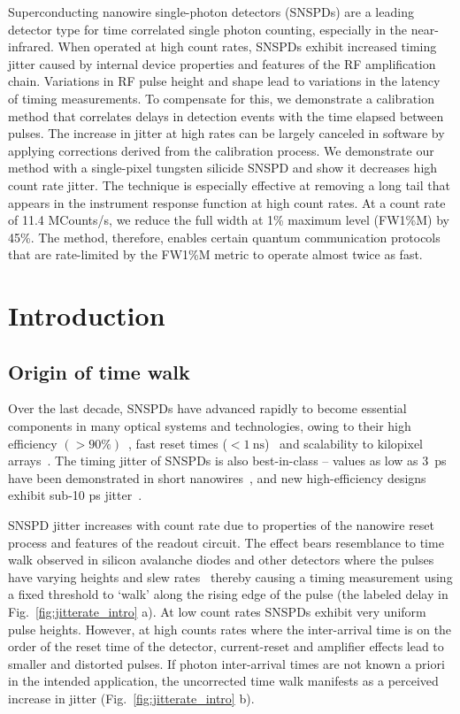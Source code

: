 \documentclass[11pt]{caltech_thesis} %
\begin{document}
Superconducting nanowire single-photon detectors (SNSPDs) are a leading
detector type for time correlated single photon counting, especially in
the near-infrared. When operated at high count rates, SNSPDs exhibit
increased timing jitter caused by internal device properties and
features of the RF amplification chain. Variations in RF pulse height
and shape lead to variations in the latency of timing measurements. To
compensate for this, we demonstrate a calibration method that correlates
delays in detection events with the time elapsed between pulses. The
increase in jitter at high rates can be largely canceled in software by
applying corrections derived from the calibration process. We
demonstrate our method with a single-pixel tungsten silicide SNSPD and
show it decreases high count rate jitter. The technique is especially
effective at removing a long tail that appears in the instrument
response function at high count rates. At a count rate of 11.4
MCounts/s, we reduce the full width at 1\% maximum level (FW1\%M) by
45\%. The method, therefore, enables certain quantum communication
protocols that are rate-limited by the FW1\%M metric to operate almost
twice as fast.

\hypertarget{introduction-1}{%
\section{Introduction}\label{introduction-1}}

\hypertarget{origin-of-time-walk}{%
\subsection{Origin of time walk}\label{origin-of-time-walk}}

Over the last decade, SNSPDs have advanced rapidly to become essential
components in many optical systems and technologies, owing to their high
efficiency
$(>90\%)$~\autocite{99.5_Chang_2021,reddy2020superconducting},
fast reset times
($< 1~\mathrm{ns}$)~\autocite{Vetter2016Cavity} and
scalability to kilopixel arrays~\autocite{Wollman2019}.
The timing jitter of SNSPDs is also best-in-class -- values as low as
3~ps have been demonstrated in short
nanowires~\autocite{Korzh2020}, and new high-efficiency
designs exhibit sub-10 ps
jitter~\autocite{EsmaeilZadeh2020,Colangelo2021}.

SNSPD jitter increases with count rate due to properties of the nanowire
reset process and features of the readout circuit. The effect bears
resemblance to time walk observed in silicon avalanche diodes and other
detectors where the pulses have varying heights and slew
rates~\autocite{SPAD_walk_Kirchnir_1997} thereby causing
a timing measurement using a fixed threshold to `walk' along the rising
edge of the pulse (the labeled delay in Fig.~\ref{fig:jitterate_intro}
a). At low count rates SNSPDs exhibit very uniform pulse heights.
However, at high counts rates where the inter-arrival time is on the
order of the reset time of the detector, current-reset and amplifier
effects lead to smaller and distorted pulses. If photon inter-arrival
times are not known a priori in the intended application, the
uncorrected time walk manifests as a perceived increase in jitter
(Fig.~\ref{fig:jitterate_intro} b).
\end{document}
